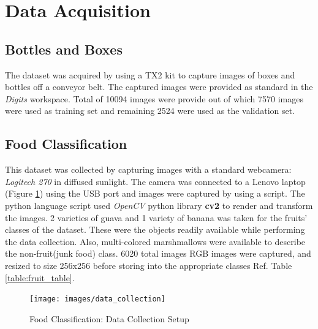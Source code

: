 \documentclass[10pt,journal,compsoc]{IEEEtran}
\begin{document}
%

\section{Data Acquisition}
\subsection{Bottles and Boxes}
The dataset was acquired by using a TX2 kit to capture images of boxes and bottles off a conveyor belt. The captured images were provided as standard in the \textit{Digits} workspace. Total of 10094 images were provide out of which 7570 images were used as training set and remaining 2524 were used as the validation set.


\subsection{Food Classification}
This dataset was collected by capturing images with a standard webcamera: \emph{Logitech 270} in diffused sunlight. The camera was connected to a Lenovo laptop (Figure \ref{fig:datacoll1}) using the USB port and images were captured by using a script\cite{capt_img_script}. The python language script used \emph{OpenCV} python library \textbf{cv2} to render and transform the images. 
2 varieties of guava and 1 variety of banana was taken for the fruits' classes of the dataset. These were the objects readily available while performing the data collection. Also, multi-colored marshmallows were available to describe the non-fruit(junk food) class.  6020 total images RGB images were captured, and resized to size 256x256 before storing into the appropriate classes Ref. Table \ref{table:fruit_table}.

\begin{figure}[thpb]
      \centering
      \texttt{[image: images/data\_collection]}
      \caption{Food Classification: Data Collection Setup}
      \label{fig:datacoll1}
\end{figure}
\end{document}
